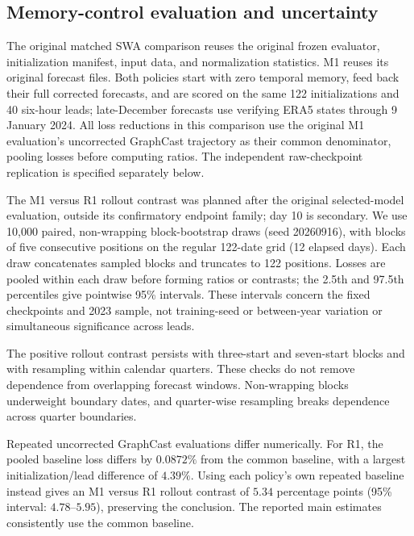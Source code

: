 \documentclass{article}
\newcommand{\vfourchange}[1]{{\color{blue}#1}}
\begin{document}
\subsection{\vfourchange{Memory-control evaluation and uncertainty}}
\label{app:memory_evaluation}

\vfourchange{The original matched SWA comparison reuses the original frozen evaluator, initialization manifest, input data, and normalization statistics. M1 reuses its original forecast files. Both policies start with zero temporal memory, feed back their full corrected forecasts, and are scored on the same 122 initializations and 40 six-hour leads; late-December forecasts use verifying ERA5 states through 9 January 2024. All loss reductions in this comparison use the original M1 evaluation's uncorrected GraphCast trajectory as their common denominator, pooling losses before computing ratios. The independent raw-checkpoint replication is specified separately below.}

\vfourchange{The M1 versus \vfourchange{R1} rollout contrast was planned after the original selected-model evaluation, outside its confirmatory endpoint family; day 10 is secondary. We use 10,000 paired, non-wrapping block-bootstrap draws (seed 20260916), with blocks of five consecutive positions on the regular 122-date grid (12 elapsed days). Each draw concatenates sampled blocks and truncates to 122 positions. Losses are pooled within each draw before forming ratios or contrasts; the 2.5th and 97.5th percentiles give pointwise 95\% intervals. These intervals concern the fixed checkpoints and 2023 sample, not training-seed or between-year variation or simultaneous significance across leads.}

\vfourchange{The positive rollout contrast persists with three-start and seven-start blocks and with resampling within calendar quarters. These checks do not remove dependence from overlapping forecast windows. Non-wrapping blocks underweight boundary dates, and quarter-wise resampling breaks dependence across quarter boundaries.}

\vfourchange{Repeated uncorrected GraphCast evaluations differ numerically. For \vfourchange{R1}, the pooled baseline loss differs by $0.0872\%$ from the common baseline, with a largest initialization/lead difference of $4.39\%$. Using each policy's own repeated baseline instead gives an M1 versus \vfourchange{R1} rollout contrast of $5.34$ percentage points (95\% interval: $4.78$--$5.95$), preserving the conclusion. The reported main estimates consistently use the common baseline.}
\end{document}
